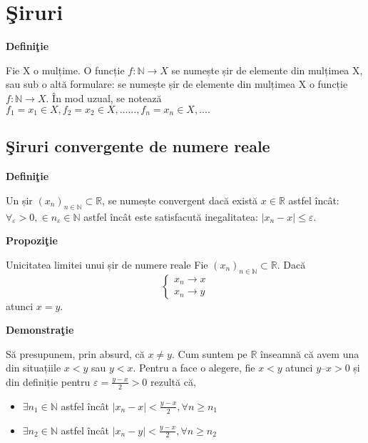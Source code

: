 \documentclass[a4paper,12pt,oneside]{report}
\begin{document}
\maketitle

\tableofcontents



\chapter{\c Siruri}

\textbf{Defini\c tie}

Fie X o mulțime. O funcție \(f:\mathbb{N} \to X\) se numește șir de elemente din mulțimea X, sau sub o altă formulare: se numește șir de elemente din mulțimea X o funcție \(f:\mathbb{N} \to X\). În mod uzual, se notează \(f_{1} = x_{1} \in X, f_{2} = x_{2} \in X,......, f_{n} = x_{n} \in X,....\)

\section{\c Siruri convergente de numere reale}
\textbf{Defini\c tie}

Un șir \((x_{n})_{n \in \mathbb{N}} \subset \mathbb{R} \), se numește convergent dacă există \(x \in \mathbb{R}\) astfel încât:
\(\forall _{\varepsilon } > 0, \in n_{\varepsilon } \in \mathbb{N} \) astfel încât este satisfacută inegalitatea: \(\left | x_{n}- x \right | \leq \varepsilon \).

\textbf{Propozi\c tie}

Unicitatea limitei unui șir de numere reale
Fie \((x_{n})_{n \in \mathbb{N}} \subset \mathbb{R}\). 
Dacă
\[\left\{\begin{matrix}
x_{n} \to  x\\ 
x_{n} \to y
\end{matrix}\right.
\]
atunci \(x=y.\)

\textbf{Demonstra\c tie}

Să presupunem, prin absurd, că \(x \neq  y\). Cum suntem pe \(\mathbb{R}\) înseamnă că avem una din situațiile \(x < y\) sau \(y < x\). Pentru a face o alegere, fie \(x < y\) atunci \(y – x > 0\) și din definiție pentru \(\varepsilon = \frac{y- x}{2}  > 0\) rezultă că, 

\begin{itemize}
  \item \(\exists  n_{1} \in \mathbb{N}\) astfel încât \(\left | x_{n} - x  \right | < \frac{y - x }{2} , \forall n \geq n_{1} \)
  \item \(\exists  n_{2} \in \mathbb{N}\) astfel încât \(\left | x_{n} - y  \right | < \frac{y - x }{2} , \forall n \geq n_{2} \)
\end{itemize}
\end{document}
